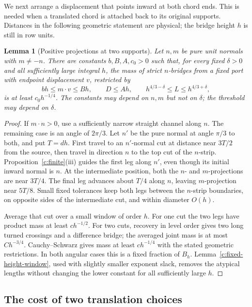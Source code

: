 \documentclass[11pt]{article}
\numberwithin{equation}{section}
\newtheorem{lemma}[theorem]{Lemma}
\theoremstyle{definition}\newtheorem{definition}[theorem]{Definition}
\theoremstyle{remark}\newtheorem{remark}[theorem]{Remark}
\begin{document}
We next arrange a displacement that points inward at both chord ends.
This is needed when a translated chord is attached back to its original
supports. Distances in the following geometric statement are physical;
the bridge height $h$ is still in row units.

\begin{lemma}[Positive projections at two supports]\label{c:positive-projection}
Let $n,m$ be pure unit normals with $m\ne-n$. There are constants
$b,B,A,c_0>0$ such that, for every fixed $\delta>0$ and all sufficiently
large integral $h$, the mass of strict $n$-bridges from a fixed port
with endpoint displacement $v$, restricted by
\[
 bh\le m\cdot v\le Bh,\qquad D\le Ah,\qquad
 h^{4/3-\delta}\le L\le h^{4/3+\delta},
\]
is at least $c_0h^{-1/4}$. The constants may depend on $n,m$ but not
on $\delta$; the threshold may depend on $\delta$.
\end{lemma}
\begin{proof}
If $m\cdot n>0$, use a sufficiently narrow straight channel along $n$.
The remaining case is an angle of $2\pi/3$. Let $n'$ be the pure normal
at angle $\pi/3$ to both, and put $T=dh$. First travel to an $n'$-normal
cut at distance near $3T/2$ from the source, then travel in direction
$n$ to the top cut of the $n$-strip. Proposition~\ref{c:finite}(iii)
guides the first leg along $n'$, even though its initial inward normal
is $n$. At the intermediate position, both the $n$- and $m$-projections
are near $3T/4$. The final leg advances about $T/4$ along $n$, leaving
$m$-projection near $5T/8$. Small fixed tolerances keep both legs
between the $n$-strip boundaries, on opposite sides of the intermediate
cut, and within diameter $O(h)$.

Average that cut over a small window of order $h$. For one cut the two
legs have product mass at least $ch^{-1/2}$. For two cuts, recovery in
level order gives two long turned crossings and a difference bridge;
the averaged joint mass is at most $Ch^{-3/4}$. Cauchy--Schwarz gives
mass at least $ch^{-1/4}$ with the stated geometric restrictions.
In both angular cases this is a fixed fraction of $B_h$.
Lemma~\ref{c:fixed-height-window}, used with slightly smaller exponent
slack, removes the atypical lengths without changing the lower constant
for all sufficiently large $h$.
\end{proof}

\subsection{The cost of two translation choices}
\end{document}
